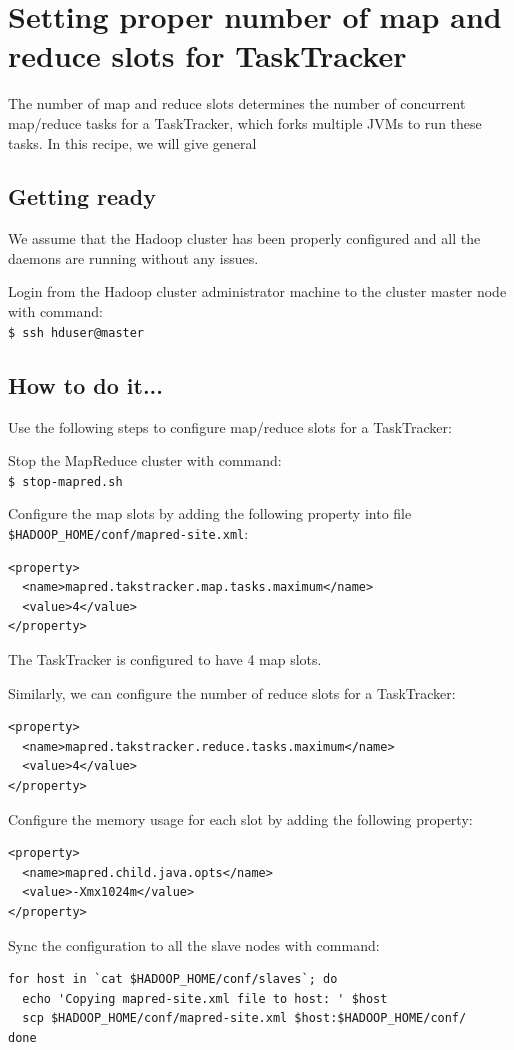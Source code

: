\section{Setting proper number of map and reduce slots for TaskTracker}
The number of map and reduce slots determines the number of concurrent map/reduce tasks for a TaskTracker, which forks multiple JVMs to run these tasks. In this recipe, we will give general
\subsection*{Getting ready}
We assume that the Hadoop cluster has been properly configured and all the daemons are running without any issues.

Login from the Hadoop cluster administrator machine to the cluster master node with command: \\
\verb|$ ssh hduser@master|
\subsection*{How to do it...}
Use the following steps to configure map/reduce slots for a TaskTracker:

Stop the MapReduce cluster with command: \\
\verb|$ stop-mapred.sh|

Configure the map slots by adding the following property into file \verb|$HADOOP_HOME/conf/mapred-site.xml|:
\lstset{style=bashstyle}
\begin{lstlisting}
<property>
  <name>mapred.takstracker.map.tasks.maximum</name>
  <value>4</value>
</property>
\end{lstlisting}

The TaskTracker is configured to have 4 map slots.

Similarly, we can configure the number of reduce slots for a TaskTracker:
\lstset{style=bashstyle}
\begin{lstlisting}
<property>
  <name>mapred.takstracker.reduce.tasks.maximum</name>
  <value>4</value>
</property>
\end{lstlisting}

Configure the memory usage for each slot by adding the following property:
\lstset{style=bashstyle}
\begin{lstlisting}
<property>
  <name>mapred.child.java.opts</name>
  <value>-Xmx1024m</value>
</property>
\end{lstlisting}

Sync the configuration to all the slave nodes with command:
\lstset{style=bashstyle}
\begin{lstlisting}
for host in `cat $HADOOP_HOME/conf/slaves`; do
  echo 'Copying mapred-site.xml file to host: ' $host
  scp $HADOOP_HOME/conf/mapred-site.xml $host:$HADOOP_HOME/conf/
done
\end{lstlisting}

